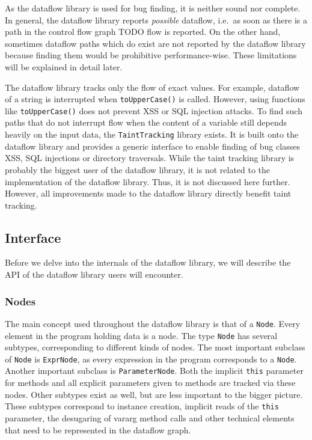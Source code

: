 As the dataflow library is used for bug finding, it is neither sound nor complete.
In general, the dataflow library reports \emph{possible} dataflow, i.e.\ as soon
as there is a path in the control flow graph TODO flow is reported.
On the other hand, sometimes dataflow paths which do exist are not reported by the 
dataflow library because finding them would be prohibitive performance-wise.
These limitations will be explained in detail later. 

The dataflow library tracks only the flow of exact values.
For example, dataflow of a string is interrupted when \texttt{toUpperCase()} is called.
However, using functions like \texttt{toUpperCase()} does not prevent XSS or SQL injection attacks.
To find such paths that do not interrupt flow when the content of a variable still depends 
heavily on the input data, the \texttt{TaintTracking} library exists.
It is built onto the dataflow library and provides a generic interface to enable
finding of bug classes XSS, SQL injections or directory traversals.
While the taint tracking library is probably the biggest user of the dataflow library,
it is not related to the implementation of the dataflow library.
Thus, it is not discussed here further.
However, all improvements made to the dataflow library directly benefit taint tracking.

\subsection{Interface}
Before we delve into the internals of the dataflow library, we will describe the API 
of the dataflow library users will encounter. %

\subsubsection*{Nodes}
The main concept used throughout the dataflow library is that of a \texttt{Node}.
Every element in the program holding data is a node.
The type \texttt{Node} has several subtypes, corresponding to different kinds of nodes.
The most important subclass of \texttt{Node} is \texttt{ExprNode}, 
as every expression in the program corresponds to a \texttt{Node}.
Another important subclass is \texttt{ParameterNode}.
Both the implicit \texttt{this} parameter for methods and all explicit parameters
given to methods are tracked via these nodes.
Other subtypes exist as well, but are less important to the bigger picture.
These subtypes correspond to instance creation, implicit reads of the \texttt{this} parameter,
the desugaring of vararg method calls and other technical elements that need to be 
represented in the dataflow graph.

